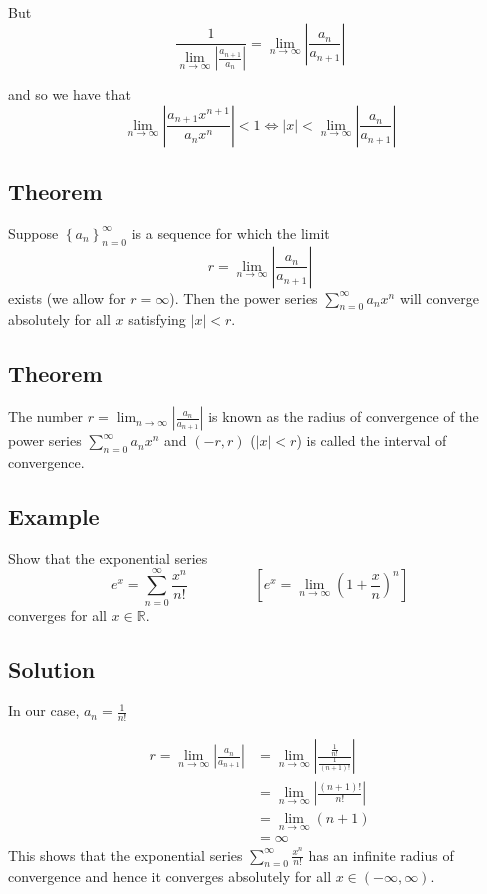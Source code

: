 \documentclass[11pt]{article}
\newcommand{\reals}{\mathbb{R}}
\begin{document}
But
\[ \frac{1}{\lim_{n\rightarrow\infty} \left| \frac{a_{n+1}}{a_n} \right|} = \lim_{n\rightarrow\infty} \left| \frac{a_n}{a_{n+1}} \right| \]

and so we have that
\[ \lim_{n\rightarrow\infty} \left| \frac{a_{n+1}x^{n+1}}{a_nx^n} \right| < 1 \Leftrightarrow |x| < \lim_{n\rightarrow\infty} \left| \frac{a_n}{a_{n+1}} \right| \]

\subsection{Theorem}
Suppose $\displaystyle{\left\{ a_n \right\}_{n=0}^\infty }$ is a sequence for which the limit
\[ r = \lim_{n\rightarrow\infty} \left| \frac{a_n}{a_{n+1}} \right| \]
exists (we allow for $r=\infty$). Then the power series $\displaystyle{\sum_{n=0}^\infty} a_nx^n$ will converge absolutely for all $x$ satisfying $|x| < r$.

\subsection{Theorem}
The number $\displaystyle{r = \lim_{n\rightarrow\infty} \left| \frac{a_n}{a_{n+1}} \right| }$ is known as the radius of convergence of the power series $\displaystyle{\sum_{n=0}^\infty a_nx^n }$ and $(-r, r)$ ($|x|<r$) is called the interval of convergence.

\subsection{Example}
Show that the exponential series
\[ e^x = \sum_{n=0}^\infty \frac{x^n}{n!} \hspace{2cm} \left[ e^x = \lim_{n\rightarrow\infty} \left(1+\frac{x}{n}\right)^n  \right] \]
converges for all $x \in \reals$.

\subsection{Solution}
In our case, $\displaystyle{a_n = \frac{1}{n!}}$

\begin{align*}
r= \lim_{n\rightarrow\infty} \left| \frac{a_n}{a_{n+1}} \right| &= \lim_{n\rightarrow\infty} \left| \frac{\frac{1}{n!}}{\frac{1}{(n+1)!}} \right| \\
&= \lim_{n\rightarrow\infty} \left| \frac{(n+1)!}{n!} \right| \\
&= \lim_{n\rightarrow\infty} (n+1) \\
&= \infty
\end{align*}
This shows that the exponential series $\displaystyle{\sum_{n=0}^\infty} \frac{x^n}{n!}$ has an infinite radius of convergence and hence it converges absolutely for all $x\in (-\infty, \infty)$.
\end{document}
